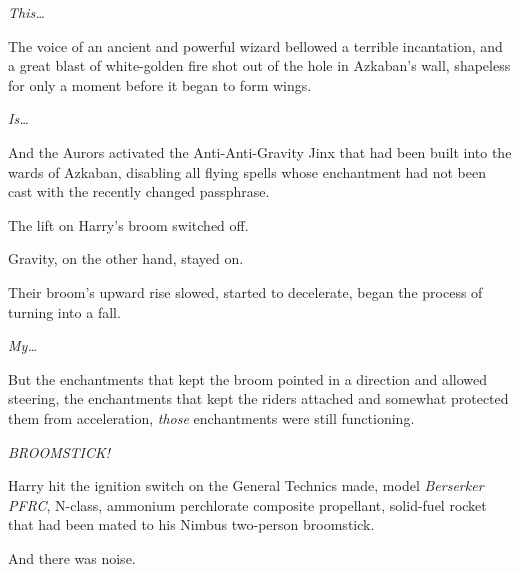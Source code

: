 \emph{This{\ldots}}

The voice of an ancient and powerful wizard bellowed a terrible incantation,
and a great blast of white-golden fire shot out of the hole in Azkaban's wall,
shapeless for only a moment before it began to form wings.

\emph{Is{\ldots}}

And the Aurors activated the Anti-Anti-Gravity Jinx that had been built into
the wards of Azkaban, disabling all flying spells whose enchantment had not
been cast with the recently changed passphrase.

The lift on Harry's broom switched off.

Gravity, on the other hand, stayed on.

Their broom's upward rise slowed, started to decelerate, began the process of
turning into a fall.

\emph{My{\ldots}}

But the enchantments that kept the broom pointed in a direction and allowed
steering, the enchantments that kept the riders attached and somewhat protected
them from acceleration, \emph{those} enchantments were still functioning.

\emph{BROOMSTICK!}

Harry hit the ignition switch on the General Technics made, model
\emph{Berserker PFRC}, N-class, ammonium perchlorate composite propellant,
solid-fuel rocket that had been mated to his Nimbus  two-person broomstick.

And there was noise.

